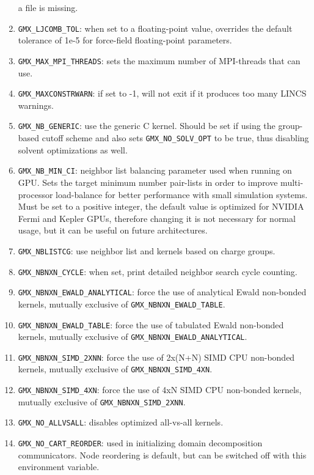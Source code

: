 \begin{enumerate}
        a file is missing.
\item   {\tt GMX_LJCOMB_TOL}: when set to a floating-point value, overrides the default tolerance of
        1e-5 for force-field floating-point parameters.
\item   {\tt GMX_MAX_MPI_THREADS}: sets the maximum number of MPI-threads that {\tt {}}
        can use.
\item   {\tt GMX_MAXCONSTRWARN}: if set to -1, {\tt {}} will
        not exit if it produces too many LINCS warnings.
\item   {\tt GMX_NB_GENERIC}: use the generic C kernel.  Should be set if using
        the group-based cutoff scheme and also sets {\tt GMX_NO_SOLV_OPT} to be true,
        thus disabling solvent optimizations as well.
\item   {\tt GMX_NB_MIN_CI}: neighbor list balancing parameter used when running on GPU. Sets the
        target minimum number pair-lists in order to improve multi-processor load-balance for better
        performance with small simulation systems. Must be set to a positive integer, the default value
        is optimized for NVIDIA Fermi and Kepler GPUs, therefore changing it is not necessary for
        normal usage, but it can be useful on future architectures.
\item   {\tt GMX_NBLISTCG}: use neighbor list and kernels based on charge groups.
\item   {\tt GMX_NBNXN_CYCLE}: when set, print detailed neighbor search cycle counting.
\item   {\tt GMX_NBNXN_EWALD_ANALYTICAL}: force the use of analytical Ewald non-bonded kernels,
        mutually exclusive of {\tt GMX_NBNXN_EWALD_TABLE}.
\item   {\tt GMX_NBNXN_EWALD_TABLE}: force the use of tabulated Ewald non-bonded kernels,
        mutually exclusive of {\tt GMX_NBNXN_EWALD_ANALYTICAL}.
\item   {\tt GMX_NBNXN_SIMD_2XNN}: force the use of 2x(N+N) SIMD CPU non-bonded kernels,
        mutually exclusive of {\tt GMX_NBNXN_SIMD_4XN}.
\item   {\tt GMX_NBNXN_SIMD_4XN}: force the use of 4xN SIMD CPU non-bonded kernels,
        mutually exclusive of {\tt GMX_NBNXN_SIMD_2XNN}.
\item   {\tt GMX_NO_ALLVSALL}: disables optimized all-vs-all kernels.
\item   {\tt GMX_NO_CART_REORDER}: used in initializing domain decomposition communicators. Node reordering
        is default, but can be switched off with this environment variable.

\end{enumerate}
